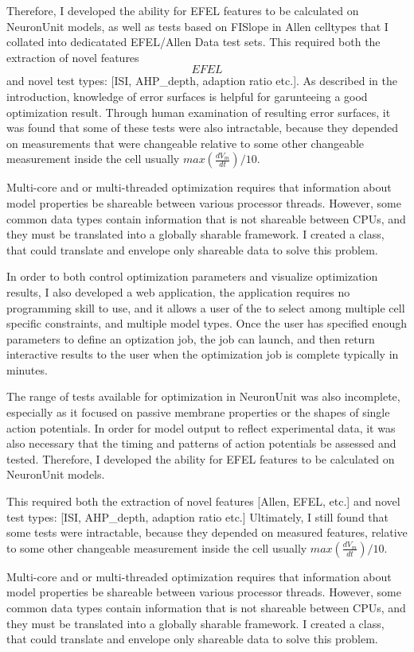 Therefore, I developed the ability for EFEL features to be calculated on NeuronUnit models, as well as tests based on FISlope in Allen celltypes that I collated into dedicatated EFEL/Allen Data test sets. This required both the extraction of novel features \[EFEL\] and novel test types: [ISI, AHP\_depth, adaption ratio etc.]. As described in the introduction, knowledge of error surfaces is helpful for garunteeing a good optimization result. Through human examination of resulting error surfaces, it was found that some of these tests were also intractable, because they depended on measurements that were changeable relative to some other changeable measurement inside the cell usually $max(\frac{dV_{m}}{dt})/10$.

Multi-core and or multi-threaded optimization requires that information about model properties be shareable between various processor threads. However, some common data types contain information that is not shareable between CPUs, and they must be translated into a globally sharable framework. I created a class, that could translate and envelope only shareable data to solve this problem.

In order to both control optimization parameters and visualize optimization results, I also developed a web application, the application requires no programming skill to use, and it allows a user of the to select among multiple cell specific constraints, and multiple model types. Once the user has specified enough parameters to define an optization job, the job can launch, and then return interactive results to the user when the optimization job is complete typically in minutes.


The range of tests available for optimization in NeuronUnit was also incomplete, especially as it focused on passive membrane properties or the shapes of single action potentials.  In order for model output to reflect experimental data, it was also necessary that the timing and patterns of action potentials be assessed and tested.  Therefore, I developed the ability for EFEL features to be calculated on NeuronUnit models. 

This required both the extraction of novel features [Allen, EFEL, etc.] and novel test types: [ISI, AHP\_depth, adaption ratio etc.] Ultimately, I still found that some tests were intractable, because they depended on measured features, relative to some other changeable measurement inside the cell usually $max(\frac{dV_{m}}{dt})/10.$

Multi-core and or multi-threaded optimization requires that information about model properties be shareable between various processor threads. However, some common data types contain information that is not shareable between CPUs, and they must be translated into a globally sharable framework. I created a class, that could translate and envelope only shareable data to solve this problem.

